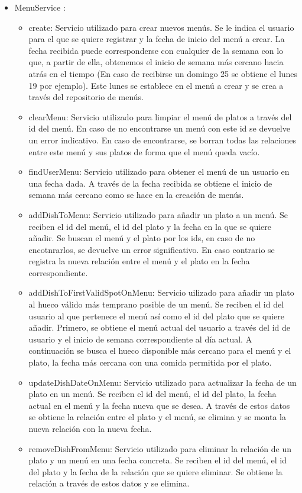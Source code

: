 \documentclass[12pt, a4paper, twoside]{book}
\begin{document}
\begin{itemize}
\begin{itemize}
		\end{itemize}
		\item MenuService :
		\begin{itemize}
			\item create: Servicio utilizado para crear nuevos menús. Se le indica el usuario para el que se quiere registrar y la fecha de inicio del menú a crear. La fecha recibida puede corresponderse con cualquier de la semana con lo que, a partir de ella, obtenemos el inicio de semana más cercano hacia atrás en el tiempo (En caso de recibirse un domingo 25 se obtiene el lunes 19 por ejemplo). Este lunes se establece en el menú a crear y se crea a través del repositorio de menús.
			\item clearMenu: Servicio utilizado para limpiar el menú de platos a través del id del menú. En caso de no encontrarse un menú con este id se devuelve un error indicativo. En caso de encontrarse, se borran todas las relaciones entre este menú y sus platos de forma que el menú queda vacío.
			\item findUserMenu: Servicio utilizado para obtener el menú de un usuario en una fecha dada. A través de la fecha recibida se obtiene el inicio de semana más cercano como se hace en la creación de menús.
			\item addDishToMenu: Servicio utilizado para añadir un plato a un menú. Se reciben el id del menú, el id del plato y la fecha en la que se quiere añadir. Se buscan el menú y el plato por los ids, en caso de no encotnrarlos, se devuelve un error significativo. En caso contrario se registra la nueva relación entre el menú y el plato en la fecha correspondiente.
			\item addDishToFirstValidSpotOnMenu: Servicio uilizado para añadir un plato al hueco válido más temprano posible de un menú. Se reciben el id del usuario al que pertenece el menú así como el id del plato que se quiere añadir. Primero, se obtiene el menú actual del usuario a través del id de usuario y el inicio de semana correspondiente al día actual. A continuación se busca el hueco disponible más cercano para el menú y el plato, la fecha más cercana con una comida permitida por el plato.
			\item updateDishDateOnMenu: Servicio utilizado para actualizar la fecha de un plato en un menú. Se reciben el id del menú, el id del plato, la fecha actual en el menú y la fecha nueva que se desea. A través de estos datos se obtiene la relación entre el plato y el menú, se elimina y se monta la nueva relación con la nueva fecha.
			\item removeDishFromMenu: Servicio utilizado para eliminar la relación de un plato y un menú en una fecha concreta. Se reciben el id del menú, el id del plato y la fecha de la relación que se quiere eliminar. Se obtiene la relación a través de estos datos y se elimina.

\end{itemize}
\end{itemize}
\end{document}
